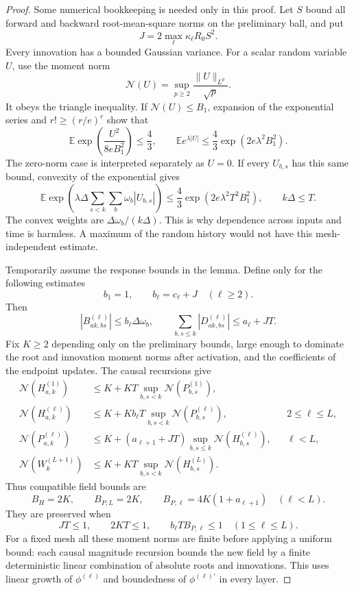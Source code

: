 \begin{proof}
Some numerical bookkeeping is needed only in this proof.  Let $S$ bound
all forward and backward root-mean-square norms on the preliminary ball,
and put
\[
 J=2\max_\ell\kappa_\ell R_0S^2.
\]
Every innovation has a bounded Gaussian variance.  For a scalar random
variable $U$, use the moment norm
\[
 \mathcal N(U)=\sup_{p\ge2}\frac{\|U\|_{L^p}}{\sqrt p}.
\]
It obeys the triangle inequality.  If $\mathcal N(U)\le B_1$, expansion
of the exponential series and $r!\ge(r/e)^r$ show that
\[
 \mathbb E\exp\!\left(\frac{U^2}{8eB_1^2}\right)\le\frac43,
 \qquad
 \mathbb E e^{\lambda|U|}
 \le\frac43\exp(2e\lambda^2B_1^2).
\]
The zero-norm case is interpreted separately as $U=0$.  If every
$U_{b,s}$ has this same bound, convexity of the exponential gives
\[
 \mathbb E\exp\!\left(
    \lambda\Delta\sum_{s<k}\sum_b\omega_b|U_{b,s}|\right)
 \le\frac43\exp(2e\lambda^2T^2B_1^2),
 \qquad k\Delta\le T.
\]
The convex weights are $\Delta\omega_b/(k\Delta)$.  This is why
dependence across inputs and time is harmless.  A maximum of the random
history would not have this mesh-independent estimate.

Temporarily assume the response bounds in the lemma.  Define only for
the following estimates
\[
 b_1=1,\qquad b_\ell=c_\ell+J\quad(\ell\ge2).
\]
Then
\[
 |B_{ak,bs}^{(\ell)}|\le b_\ell\Delta\omega_b,
 \qquad
 \sum_{b,s\le k}|D_{ak,bs}^{(\ell)}|\le a_\ell+JT.
\]
Fix $K\ge2$ depending only on the preliminary bounds, large enough to
dominate the root and innovation moment norms after activation, and the
coefficients of the endpoint updates.  The causal recursions give
\begin{align*}
 \mathcal N(H_{a,k}^{(1)})
 &\le K+KT\sup_{b,s<k}\mathcal N(P_{b,s}^{(1)}),\\
 \mathcal N(H_{a,k}^{(\ell)})
 &\le K+Kb_\ell T\sup_{b,s<k}\mathcal N(P_{b,s}^{(\ell)}),
       &&2\le\ell\le L,\\
 \mathcal N(P_{a,k}^{(\ell)})
 &\le K+(a_{\ell+1}+JT)
             \sup_{b,s\le k}\mathcal N(H_{b,s}^{(\ell)}),
       &&\ell<L,\\
 \mathcal N(W_k^{(L+1)})
 &\le K+KT\sup_{b,s<k}\mathcal N(H_{b,s}^{(L)}).
\end{align*}
Thus compatible field bounds are
\[
 B_H=2K,\qquad B_{P,L}=2K,\qquad
 B_{P,\ell}=4K(1+a_{\ell+1})\quad(\ell<L).
\]
They are preserved when
\[
 JT\le1,\qquad2KT\le1,\qquad
 b_\ell T B_{P,\ell}\le1\quad(1\le\ell\le L).
\]
For a fixed mesh all these moment norms are finite before applying a
uniform bound: each causal magnitude recursion bounds the new field by
a finite deterministic linear combination of absolute roots and
innovations.  This uses linear growth of $\phi^{(\ell)}$ and boundedness
of $\phi^{(\ell)\prime}$ in every layer.


\end{proof}

